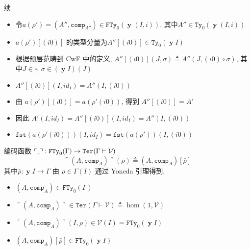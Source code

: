 \documentclass[aspectratio=169,xcolor=dvipsnames]{beamer}
\newcommand\calV{\mathcal{V}}
\newcommand\FTy{\mathtt{FTy}}
\newcommand\comp{\mathtt{comp}}
\newcommand\fst{\mathtt{fst}}
\newcommand\Ty{\mathtt{Ty}}
\newcommand\Ter{\mathtt{Ter}}
\newcommand{\ul}{{\scalebox{0.4}[1.0]{\_}}}
\DeclareMathOperator\y{\mathbf{y}}
\begin{document}
\begin{frame}{续}
  \begin{itemize}
    \item 令$a(\rho') = (A'',\comp_{A''}) \in \FTy_{0}(\y(I,i))$, 其中$A''\in\Ty_{0}(\y(I,i))$
    \item $a(\rho')[(i0)]$ 的类型分量为$A''[(i0)]\in\Ty_{0}(\y I)$
    \item 根据预层范畴到 CwF 中的定义, $A''[(i0)](J,\sigma)\triangleq A''(J,(i0)\circ\sigma)$, 其中$J\in\square$, $\sigma\in(\y I)(J)$
    \item $A''[(i0)](I,id_I) = A''(I,(i0))$
    \item 由 $a(\rho')[(i0)] = a(\rho'(i0))$, 得到 $A''[(i0)] = A'$
    \item 因此 $A'(I,id_I) = A''[(i0)](I,id_I) = A''(I,(i0))$
    \item $\fst(a(\rho'(i0)))(I,id_I) = \fst(a(\rho'))(I,(i0))$
  \end{itemize}
\end{frame}

\begin{frame}[shrink]{编码函数}
  $\ulcorner\ul\urcorner : \FTy_{0}(\Gamma)\to\Ter(\Gamma\vdash\calV)$
  \[ \ulcorner(A,\comp_{A})\urcorner(\rho) \triangleq (A,\comp_{A})[\bar{\rho}] \]
  其中$\bar{\rho}:\y I\to\Gamma$ 由 $\rho\in\Gamma(I)$ 通过 Yoneda 引理得到.
  \begin{itemize}
    \item $(A,\comp_{A})\in\FTy_{0}(\Gamma)$
    \item $\ulcorner(A,\comp_{A})\urcorner \in \Ter(\Gamma\vdash\calV)\triangleq\hom(1,\calV)$
    \item $\ulcorner(A,\comp_{A})\urcorner(I,\rho) \in \calV(I)=\FTy_{0}(\y I)$
    \item $(A,\comp_{A})[\bar{\rho}] \in \FTy_{0}(\y I)$
  \end{itemize}
\end{frame}
\end{document}
